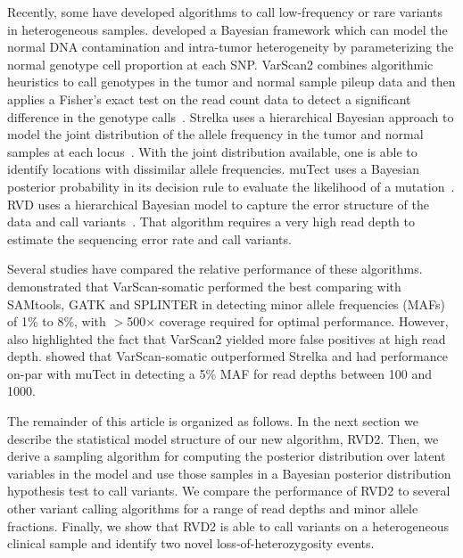 \documentclass{bioinfo}
\begin{document}
Recently, some have developed algorithms to call low-frequency or rare variants in heterogeneous samples.
\citet{yau2010statistical} developed a Bayesian framework which can model the normal DNA contamination and intra-tumor heterogeneity by parameterizing the normal genotype cell proportion at each SNP. 
VarScan2 combines algorithmic heuristics to call genotypes in the tumor and normal sample pileup data and then applies a Fisher's exact test on the read count data to detect a significant difference in the genotype calls~\citep{Koboldt:2012cg}. 
Strelka uses a hierarchical Bayesian approach to model the joint distribution of the allele frequency in the tumor and normal samples at each locus~\citep{Saunders:2012fh}. 
With the joint distribution available, one is able to identify locations with dissimilar allele frequencies. 
muTect uses a Bayesian posterior probability in its decision rule to evaluate the likelihood of a mutation~\citep{Cibulskis:2013ta}. 
RVD uses a hierarchical Bayesian model to capture the error structure of the data and call variants~\citep{Flaherty:2011ja, cushing2013rvd}. 
That algorithm requires a very high read depth to estimate the sequencing error rate and call variants.


Several studies have compared the relative performance of these algorithms. 
\citet{spencer2013performance} demonstrated  that VarScan-somatic performed the best comparing with SAMtools, GATK and SPLINTER in detecting minor allele frequencies (MAFs) of 1\% to 8\%, with $ > $500× coverage required for optimal performance. 
However, \citet{spencer2013performance} also highlighted the fact that VarScan2 yielded more false positives at high read depth. 
\citet{Stead:2013fu} showed that VarScan-somatic outperformed Strelka and had performance on-par with muTect in detecting a 5\% MAF for read depths between 100 and 1000. %

The remainder of this article is organized as follows. 
In the next section we describe the statistical model structure of our new algorithm, RVD2. 
Then, we derive a sampling algorithm for computing the posterior distribution over latent variables in the model and use those samples in a Bayesian posterior distribution hypothesis test to call variants. 
We compare the performance of RVD2 to several other variant calling algorithms for a range of read depths and minor allele fractions. 
Finally, we show that RVD2 is able to call variants on a heterogeneous clinical sample and identify two novel loss-of-heterozygosity events.
\end{document}
